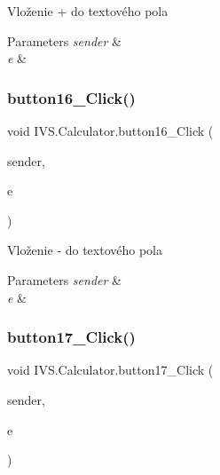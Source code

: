 Vloženie \textquotesingle{}+\textquotesingle{} do textového pola 


\begin{DoxyParams}{Parameters}
{\em sender} & \\
\hline
{\em e} & \\
\hline
\end{DoxyParams}
\mbox{\label{class_i_v_s_1_1_calculator_a8e6a0c70145a0d3bfe53de19b9e980ea}} 
\subsubsection{\texorpdfstring{button16\+\_\+\+Click()}{button16\_Click()}}
{\footnotesize\ttfamily void I\+V\+S.\+Calculator.\+button16\+\_\+\+Click (\begin{DoxyParamCaption}\item[{object}]{sender,  }\item[{Event\+Args}]{e }\end{DoxyParamCaption})\hspace{0.3cm}{\ttfamily [protected]}}



Vloženie \textquotesingle{}-\/\textquotesingle{} do textového pola 


\begin{DoxyParams}{Parameters}
{\em sender} & \\
\hline
{\em e} & \\
\hline
\end{DoxyParams}
\mbox{\label{class_i_v_s_1_1_calculator_a4aeaedb8a5683241723ba2c8a7046912}} 
\subsubsection{\texorpdfstring{button17\+\_\+\+Click()}{button17\_Click()}}
{\footnotesize\ttfamily void I\+V\+S.\+Calculator.\+button17\+\_\+\+Click (\begin{DoxyParamCaption}\item[{object}]{sender,  }\item[{Event\+Args}]{e }\end{DoxyParamCaption})\hspace{0.3cm}{\ttfamily [protected]}}



